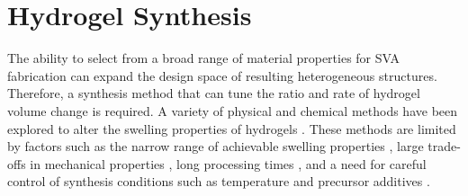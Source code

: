 \section{Hydrogel Synthesis}
The ability to select from a broad range of material properties for SVA fabrication can expand the design space of resulting heterogeneous structures. Therefore, a synthesis method that can tune the ratio and rate of hydrogel volume change is required. 
A variety of physical and chemical methods have been explored to alter the swelling properties of hydrogels \cite{Zhang2008,Imran2010}. 
These methods are limited by factors such as the narrow range of achievable swelling properties \cite{Kim2016a,Gan2001}, large trade-offs in mechanical properties \cite{Li2018,Depa2012}, long processing times \cite{Zhou2018b, Ma2014}, and a need for careful control of synthesis conditions such as temperature \cite{Otsuka2012} and precursor additives \cite{Bodenberger2016}.\\ 

